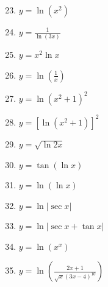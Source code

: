 \documentclass[12pt]{article}
\newif\ifans
\begin{document}
\begin{enumerate}
\setcounter{enumi}{22}

\item $y = \ln{(x^2)}$ 

\ifans{\fbox{$\frac{2}{x}$}} \fi

\item $y = \frac{1}{\ln{(3x)}}$ 

\ifans{\fbox{$-\frac{1}{x[\ln{(3x)}]^2}$}} \fi

\item $y = x^2\ln{x}$ 

\ifans{\fbox{$x+2x\ln{x}$}} \fi

\item $y = \ln{\left(\frac{1}{x}\right)}$ 

\ifans{\fbox{$-\frac{1}{x}$}} \fi

\item $y = \ln{(x^2+1)^2}$ 

\ifans{\fbox{$\frac{4x}{x^2+1}$}} \fi

\item $y = \left[\ln{(x^2+1)}\right]^2$ 

\ifans{\fbox{$\frac{4x\ln{(x^2+1)}}{x^2+1}$}} \fi

\item $y = \sqrt{\ln{2x}}$ 

\ifans{\fbox{$\frac{1}{2x\sqrt{\ln{(2x)}}}$}} \fi

\item $y = \tan{(\ln{x})}$ 

\ifans{\fbox{$\frac{1}{x}\sec^{2}(\ln{x})$}} \fi

\item $y = \ln{(\ln x)}$ 

\ifans{\fbox{$\frac{1}{x\ln{x}}$}} \fi

\item $y=\ln{|\sec{x}|}$

\ifans{\fbox{$\tan{x}$}} \fi

\item $y=\ln{|\sec{x}+\tan{x}|}$

\ifans{\fbox{$\sec{x}$}} \fi

\item $y=\ln{\left(x^x\right)}$

\ifans{\fbox{$1+\ln(x)$}} \fi

\item $y=\ln{\left(\frac{2x+1}{\sqrt{x}(3x-4)^{10}}\right)}$

\ifans{\fbox{$\frac{2}{2x+1}-\frac{1}{2x}-\frac{30}{3x-4}$}} \fi


\end{enumerate}
\end{document}
